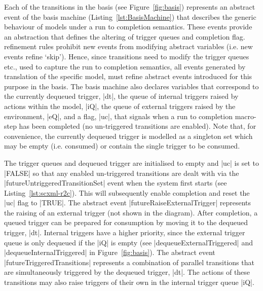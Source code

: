 Each of the transitions in the basis (see Figure~\ref{fig:basis}) represents an abstract event of the basis machine (Listing~\ref{lst:BasisMachine}) that describes the generic behaviour of models under a run to completion semantics.
These events provide an abstraction that defines the altering of trigger queues and completion flag. 
\EventB refinement rules prohibit new events from modifying abstract variables (i.e. new events refine `skip').
Hence, since \SCXML transitions need to modify the trigger queues etc., used to capture the \SCXML run to completion semantics, all events generated by translation of the specific \SCXML model,  must refine abstract events introduced for this purpose in the basis.
The basis machine also declares variables that correspond to the currently dequeued trigger,  |dt|, 
the queue of internal triggers raised by actions within the model, |iQ|, 
the queue of external triggers raised by the environment, |eQ|,
and a flag, |uc|, that signals when a run to completion macro-step has been completed 
(no un-triggered transitions are enabled). 
Note that, for convenience, the currently dequeued trigger is modelled as a singleton set which may be empty (i.e. consumed) or contain the single trigger to be consumed.

The trigger queues and dequeued trigger are initialised to empty and |uc| is set to |FALSE| so that any enabled un-triggered transitions are dealt with via the |futureUntriggeredTransitionSet| event when the system first starts (see Listing~\ref{lst:scxml-r2c}).
This will subsequently enable completion and reset the |uc| flag to |TRUE|.
The abstract event |futureRaiseExternalTrigger| represents the raising  of an external trigger (not shown in the diagram).    
After completion, a queued trigger can be prepared for consumption by moving it to the dequeued trigger, |dt|.
Internal triggers have a higher priority, since the external trigger queue is only dequeued if the |iQ| is empty (see |dequeueExternalTriggered| and |dequeueInternalTriggered| in Figure~\ref{fig:basis}).
The abstract event |futureTriggeredTransitions| represents a combination of parallel transitions that are simultaneously triggered by the dequeued trigger, |dt|.
The actions of these transitions may also raise triggers of their own in the internal trigger queue |iQ|.


